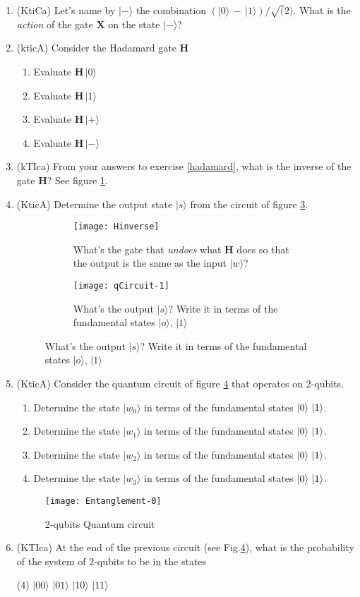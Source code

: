 \documentclass{article}
\begin{document}
\begin{enumerate}
\item (KtiCa) Let's name by $|-\rangle$ the combination $(|0\rangle\,-\,|1\rangle)/\sqrt(2)$. What is the \textit{action} of the gate $\mathbf{X}$ on the state $|-\rangle$?
\item (kticA) \label{hadamard}Consider the Hadamard gate $\mathbf{H}$
	\begin{enumerate}
	\item Evaluate $\mathbf{H}\,|0\rangle$
	\item Evaluate $\mathbf{H}\,|1\rangle$
	\item Evaluate $\mathbf{H}\,|+\rangle$
	\item Evaluate $\mathbf{H}\,|-\rangle$
	\end{enumerate}
\item (kTIca) From your answers to exercise \ref{hadamard}, what is the inverse of the gate $\mathbf{H}$? See figure \ref{Hinverse}.
\item (KticA) Determine the output state $|s\rangle$ from the circuit of figure \ref{qCircuit-1}.
\begin{figure}[h!]
\centering
	\begin{subfigure}[h]{0.7\textwidth}
	\texttt{[image: Hinverse]}
	\caption{What's the gate that \textit{undoes} what $\mathbf{H}$ does so that the output is the same as the input $|w\rangle$?}
	\label{Hinverse}
	\end{subfigure}
	\begin{subfigure}[h]{0.7\textwidth}
	\texttt{[image: qCircuit-1]}
	\caption{What's the output $|s\rangle$? Write it in terms of the fundamental states $|o\rangle,\,|1\rangle$}
	\label{qCircuit-1}
	\end{subfigure}
\end{figure}
\item (KticA) Consider the quantum circuit of figure \ref{Entanglement-0} that operates on 2-qubits.
	\begin{enumerate}
	\item Determine the state $|w_0\rangle$ in terms of the fundamental states $|0\rangle\,\mbox\,|1\rangle$. 
	\item Determine the state $|w_1\rangle$ in terms of the fundamental states $|0\rangle\,\mbox\,|1\rangle$. 
	\item Determine the state $|w_2\rangle$ in terms of the fundamental states $|0\rangle\,\mbox\,|1\rangle$. 
	\item Determine the state $|w_3\rangle$ in terms of the fundamental states $|0\rangle\,\mbox\,|1\rangle$. 
	\end{enumerate}
\begin{figure}[h]
\centering
\texttt{[image: Entanglement-0]}
\caption{2-qubits Quantum circuit}
\label{Entanglement-0}
\end{figure}
\item (KTIca) At the end of the previous circuit (see Fig.\ref{Entanglement-0}), what is the probability of the system of 2-qubits to be in the states
	\begin{tasks}(4) \task $|00\rangle$ \task $|01\rangle$ \task $|10\rangle$ \task $|11\rangle$  \end{tasks}
\end{enumerate}
\end{document}
